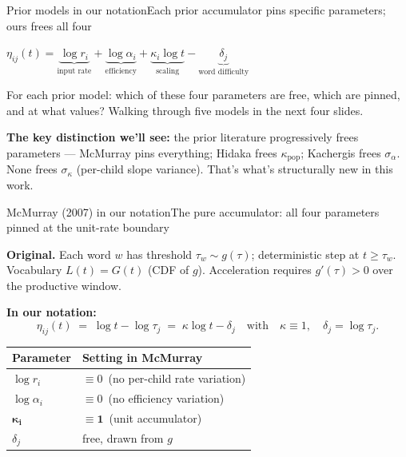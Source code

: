 \documentclass[aspectratio=169,t]{beamer}
\renewcommand{\arraystretch}{1.10}
\begin{document}
\begin{frame}{Prior models in our notation}{Each prior accumulator pins specific parameters; ours frees all four}

\centering
$\eta_{ij}(t) =
\underbrace{\log r_i}_{\text{input rate}} +
\underbrace{\log\alpha_i}_{\text{efficiency}} +
\underbrace{\kappa_i \log t}_{\text{scaling}} -
\underbrace{\delta_j}_{\text{word difficulty}}$

\vspace{1.0em}

\small
For each prior model: which of these four parameters are free, which
are pinned, and at what values? Walking through five models in the
next four slides.

\vspace{0.5em}

\textbf{The key distinction we'll see:} the prior literature
progressively frees parameters --- McMurray pins everything; Hidaka
frees $\kappa_{\text{pop}}$; Kachergis frees $\sigma_\alpha$. None
frees $\sigma_\kappa$ (per-child slope variance). That's what's
structurally new in this work.

\end{frame}

\begin{frame}{McMurray (2007) in our notation}{The pure accumulator: all four parameters pinned at the unit-rate boundary}

\small
\textbf{Original.} Each word $w$ has threshold $\tau_w \sim g(\tau)$;
deterministic step at $t \ge \tau_w$. Vocabulary $L(t) = G(t)$ (CDF of $g$).
Acceleration requires $g'(\tau) > 0$ over the productive window.

\vspace{0.6em}
\centering
\textbf{In our notation:}
\[
\eta_{ij}(t) \;=\; \log t - \log\tau_j \;=\; \kappa \log t - \delta_j
\quad\text{with}\quad \kappa \equiv 1,\quad \delta_j = \log\tau_j.
\]

\vspace{0.4em}
\renewcommand{\arraystretch}{1.20}
\begin{tabular}{@{}ll@{}}
\toprule
\textbf{Parameter} & \textbf{Setting in McMurray} \\
\midrule
$\log r_i$         & $\equiv 0$ \,(no per-child rate variation) \\
$\log\alpha_i$     & $\equiv 0$ \,(no efficiency variation) \\
$\boldsymbol{\kappa_i}$ & $\boldsymbol{\equiv 1}$ \,(unit accumulator) \\
$\delta_j$         & free, drawn from $g$ \\
\bottomrule
\end{tabular}

\end{frame}
\end{document}
